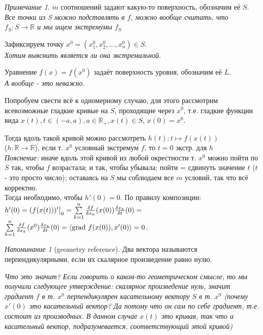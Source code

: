 \documentclass[a4paper]{article}
\theoremstyle{indented}
\theoremstyle{definition}
\theoremstyle{remark}
\newtheorem{remark}{Примечание}
\newtheorem{remind}{Напоминание}
\begin{document}
\begin{remark}
    $m$ соотношений задают какую-то поверхность, обозначим её $S$.
    \textit{Все точки из S можно подставлять в $f$, можно вообще 
    считать, что $f_S: S \to \mathbb{R}$ и мы ищем экстремумы $f_S$}

    Зафиксируем точку $x^0 = (x^0_1, x^0_2, ... , x^0_n) \in S$. \\
    \textit{Хотим выяснить является ли она экстремальной.}

    Уравнение $f(x)=f(x^0)$ задаёт поверхность уровня, 
    обозначим её $L$. \\
    \textit{А вообще - это неважно.}

    Попробуем свести всё к одномерному случаю, для
    этого рассмотрим всевозможные гладкие кривые на $S$, проходящие через $x^0$, 
    т.е. гладкие функции вида 
    $x(t), t\in (-a, a), a \in \mathbb{R}_+, x(t) \in S$,
    $x(0)=x^0$. 
    
    Тогда вдоль такой кривой можно рассмотреть $h(t): t \mapsto f(x(t))$\\
    ($h: \mathbb{R} \to \mathbb{R}$), если т. $x^0$ условный экстремум $f$, 
    то $t=0$ экстр. для $h$ \\
    \textit{Пояснение:} иначе вдоль этой кривой из любой 
    окрестности т. $x^0$ можно пойти по $S$ так, чтобы $f$ возрастала; и так, чтобы
    убывала; пойти = сдвинуть значение $t$ ($t$ - это просто число); оставаясь
    на $S$ мы соблюдаем все $m$ условий, так что всё корректно.\\
    Тогда необходимо, чтобы $h'(0)=0$. По правилу композиции: 
    $h'(0)=(f(x(t)))'\big|_{0}=\sum\limits_{k=1}^{n} \frac{\delta f}{\delta x_k}(x(0)) \frac{\delta x_k}{\delta t}(0)=$
    $\sum\limits_{k=1}^{n} \frac{\delta f}{\delta x_k}(x^0) \frac{\delta x_k}{\delta t}(0)=\langle \textrm{grad } f(x(0)), x'(0) \rangle = 0$.
    
    \begin{remind}[geometry reference]
        Два вектора называются перпендикулярными, если их 
        скалярное произведение равно нулю. 
    \end{remind}

    \textit{Что это значит? Если говорить о каком-то геометрическом смысле, 
    то мы получили следующее утверждение: скалярное произведение нуль, значит
    градиент $f$ в т. $x^0$ перпендикулярен касательному вектору $S$ в т. $x^0$ 
    (почему $x'(0)$ это касательный вектор? Да потому что он сам по себе градиент,
    т.е. состоит из производных. В данном случае $x(t)$ это кривая, так что
    и касательный вектор, подразумевается, соответствующий этой кривой)}
    

\end{remark}
\end{document}
